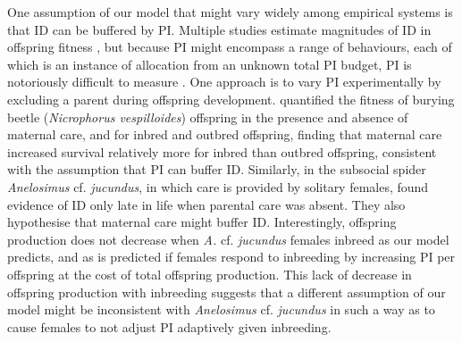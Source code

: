 \documentclass[12pt]{article}
\begin{document}
One assumption of our model that might vary widely among empirical systems is that ID can be buffered by PI. Multiple studies estimate magnitudes of ID in offspring fitness \cite[][]{Charlesworth2009, Szulkin2012}, but because PI might encompass a range of behaviours, each of which is an instance of allocation from an unknown total PI budget, PI is notoriously difficult to measure \cite[][]{Parker2002}. One approach is to vary PI experimentally by excluding a parent during offspring development. \cite{Pilakouta2015} quantified the fitness of burying beetle (\textit{Nicrophorus vespilloides}) offspring in the presence and absence of maternal care, and for inbred and outbred offspring, finding that maternal care increased survival relatively more for inbred than outbred offspring, consistent with the assumption that PI can buffer ID. Similarly, in the subsocial spider \textit{Anelosimus} cf. \textit{jucundus}, in which care is provided by solitary females, \cite{Aviles2006} found evidence of ID only late in life when parental care was absent. They also hypothesise that maternal care might buffer ID. Interestingly, offspring production does not decrease when \textit{A.} cf. \textit{jucundus} females inbreed as our model predicts, and as is predicted if females respond to inbreeding by increasing PI per offspring at the cost of total offspring production. This lack of decrease in offspring production with inbreeding suggests that a different assumption of our model might be inconsistent with \textit{Anelosimus} cf. \textit{jucundus} in such a way as to cause females to not adjust PI adaptively given inbreeding.
\end{document}
